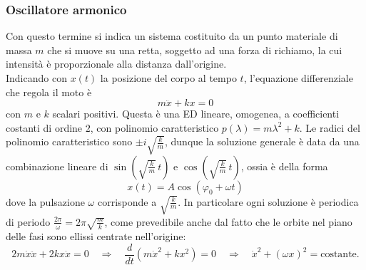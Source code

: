 \documentclass[a4paper,twoside]{article}
\theoremstyle{definition}
\numberwithin{theorem}{section}
\begin{document}
\subsubsection{Oscillatore armonico}
Con questo termine si indica un sistema costituito da un punto materiale di massa $m$ che si muove su una retta, soggetto ad una forza di richiamo, la cui intensità è proporzionale alla distanza dall'origine. \\
Indicando con $x(t)$ la posizione del corpo al tempo $t$, l'equazione differenziale che regola il moto è
$$ m\ddot{x} + k x = 0 $$
con $m$ e $k$ scalari positivi. Questa è una ED lineare, omogenea, a coefficienti costanti di ordine $2$, con polinomio caratteristico $p(\lambda)=m\lambda^2+k$. Le radici del polinomio caratteristico sono $\pm i\sqrt{\frac{k}{m}}$, dunque la soluzione generale è data da una combinazione lineare di $\sin\left(\sqrt{\frac{k}{m}}\,t\right)$ e $\cos\left(\sqrt{\frac{k}{m}}\,t\right)$, ossia è della forma 
$$ x(t) = A \cos\left(\varphi_0 + \omega t\right) $$
dove la pulsazione $\omega$ corrisponde a $\sqrt{\frac{k}{m}}$. In particolare ogni soluzione è periodica di periodo $\frac{2\pi}{\omega} = 2\pi\sqrt{\frac{m}{k}}$, come prevedibile anche dal fatto che le orbite nel piano delle fasi sono ellissi centrate nell'origine:
$$ 2m\dot{x}\ddot{x} + 2k x \dot{x}=0\quad\Longrightarrow\quad \frac{d}{dt}\left(m\dot{x}^2+k x^2\right) = 0\quad \Longrightarrow\quad \dot{x}^2+(\omega x)^2=\text{costante}.$$
\end{document}
